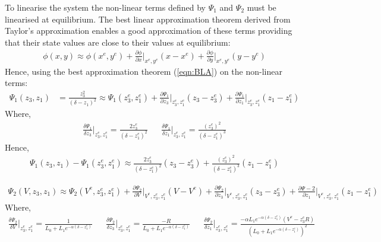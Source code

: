 \documentclass[a4paper,10pt,reqno]{amsart}
\numberwithin{equation}{section}
\begin{document}
\par To linearise the system the non-linear terms defined by $\Psi_1$ and $\Psi_2$ must be linearised at equilibrium.
The best linear approximation theorem derived from Taylor's approximation enables a good approximation of these terms providing that their state values are close to their values at equilibrium:
\begin{gather}
    \phi(x, y) {}\approx{} \phi(x^e, y^e)+ \frac{\partial \phi}{\partial x}\Bigg\rvert_{x^e,y^e}(x-x^e)+\frac{\partial \phi}{\partial y}\Bigg\rvert_{x^e,y^e}(y-y^e)
    \label{eqn:BLA}
\end{gather}
Hence, using the best approximation theorem (\ref{eqn:BLA}) on the non-linear terms:
\begin{align*}
    \Psi_1(z_3,z_1)&=\frac{z_3^2}{(\delta-z_1)^2}\approx\Psi_1(z_3^e,z_1^e)+\frac{\partial\Psi_1}{\partial z_3}\Bigg\rvert_{z_3^e,z_1^e}(z_3-z_3^e)+\frac{\partial\Psi_1}{\partial z_1}\Bigg\rvert_{z_3^e,z_1^e}(z_1-z_1^e)
\end{align*}
Where,
\begin{align*}
    \frac{\delta\Psi_1}{\delta z_3}\Bigg\rvert_{z_3^e,z_1^e}=\frac{2z_3^e}{(\delta-z_1^e)^2}
    && 
    \frac{\delta\Psi_1}{\delta z_1}\Bigg\rvert_{z_3^e,z_1^e}=\frac{(z_3^e)^2}{(\delta-z_1^e)^3}
\end{align*}
Hence,
\begin{align}\label{eqn:Phi_1 lin}
    \Psi_1(z_3,z_1) - \Psi_1(z_3^e,z_1^e) \approx \frac{2z_3^e}{(\delta-z_1^e)^2}(z_3-z_3^e) + \frac{(z_3^e)^2}{(\delta-z_1^e)^3}(z_1-z_1^e)
\end{align}

\begin{align*}
    \Psi_2(V,z_3,z_1)\approx\Psi_2(V^e,z_3^e,z_1^e)+\frac{\partial\Psi_2}{\partial V}\Bigg\rvert_{V^e, z_3^e,z_1^e}(V-V^e)+\frac{\partial\Psi_2}{\partial z_3}\Bigg\rvert_{V^e, z_3^e,z_1^e}(z_3-z_3^e)+\frac{\partial\Psi-2}{\partial z_1}\Bigg\rvert_{V^e,z_3^e,z_1^e}(z_1-z_1^e)
\end{align*}
Where,
\begin{align*}
    \frac{\delta\Psi_2}{\delta V}\Bigg\rvert_{z_3^e,z_1^e} = \frac{1}{L_0+L_1e^{-\alpha(\delta-z_1^e)}}
    &&\frac{\delta\Psi_2}{\delta z_3}\Bigg\rvert_{z_3^e,z_1^e}=\frac{-R}{L_0+L_1e^{-\alpha(\delta-z_1^e)}}
    &&\frac{\delta\Psi_2}{\delta z_1}\Bigg\rvert_{z_3^e,z_1^e}=\frac{-\alpha L_1e^{-\alpha(\delta-z_1^e)}(V^e-z_3^eR)}{(L_0+L_1e^{-\alpha(\delta-z_1^e)})^2}
\end{align*}
   
\end{document}
